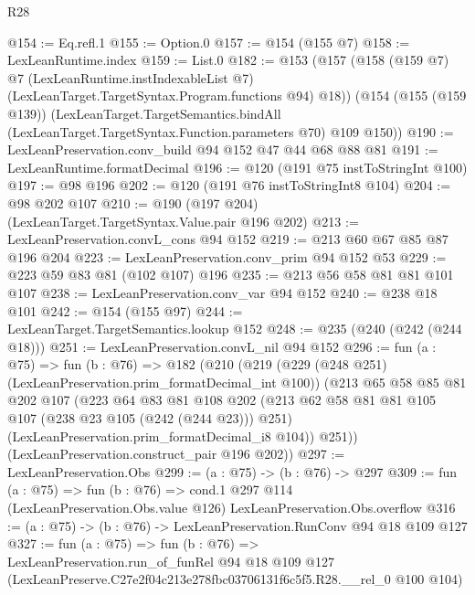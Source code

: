 \begin{lexlean}{R28}
\begin{coremodule}
@154 := Eq.refl.{1}
@155 := Option.{0}
@157 := @154 (@155 @7)
@158 := LexLeanRuntime.index
@159 := List.{0}
@182 := @153
    (@157
      (@158
        (@159 @7)
        @7
        (LexLeanRuntime.instIndexableList @7)
        (LexLeanTarget.TargetSyntax.Program.functions @94)
        @18))
    (@154
      (@155 (@159 @139))
      (LexLeanTarget.TargetSemantics.bindAll
        (LexLeanTarget.TargetSyntax.Function.parameters @70)
        @109
        @150))
@190 := LexLeanPreservation.conv_build @94 @152 @47 @44 @68 @88 @81
@191 := LexLeanRuntime.formatDecimal
@196 := @120 (@191 @75 instToStringInt @100)
@197 := @98 @196
@202 := @120 (@191 @76 instToStringInt8 @104)
@204 := @98 @202 @107
@210 := @190 (@197 @204) (LexLeanTarget.TargetSyntax.Value.pair @196 @202)
@213 := LexLeanPreservation.convL_cons @94 @152
@219 := @213 @60 @67 @85 @87 @196 @204
@223 := LexLeanPreservation.conv_prim @94 @152 @53
@229 := @223 @59 @83 @81 (@102 @107) @196
@235 := @213 @56 @58 @81 @81 @101 @107
@238 := LexLeanPreservation.conv_var @94 @152
@240 := @238 @18 @101
@242 := @154 (@155 @97)
@244 := LexLeanTarget.TargetSemantics.lookup @152
@248 := @235 (@240 (@242 (@244 @18)))
@251 := LexLeanPreservation.convL_nil @94 @152
@296 := fun (a : @75) =>
  fun (b : @76) =>
  @182
    (@210
      (@219
        (@229 (@248 @251) (LexLeanPreservation.prim_formatDecimal_int @100))
        (@213
          @65
          @58
          @85
          @81
          @202
          @107
          (@223
            @64
            @83
            @81
            @108
            @202
            (@213 @62 @58 @81 @81 @105 @107 (@238 @23 @105 (@242 (@244 @23))) @251)
            (LexLeanPreservation.prim_formatDecimal_i8 @104))
          @251))
      (LexLeanPreservation.construct_pair @196 @202))
@297 := LexLeanPreservation.Obs
@299 := (a : @75) -> (b : @76) -> @297
@309 := fun (a : @75) =>
  fun (b : @76) =>
  cond.{1} @297 @114 (LexLeanPreservation.Obs.value @126) LexLeanPreservation.Obs.overflow
@316 := (a : @75) -> (b : @76) -> LexLeanPreservation.RunConv @94 @18 @109 @127
@327 := fun (a : @75) =>
  fun (b : @76) =>
  LexLeanPreservation.run_of_funRel
    @94
    @18
    @109
    @127
    (LexLeanPreserve.C27e2f04c213e278fbc03706131f6c5f5.R28.__rel_0 @100 @104)
\end{coremodule}
\end{lexlean}

